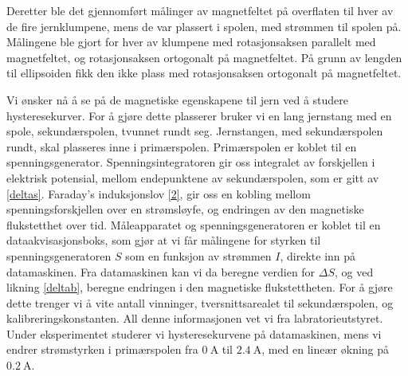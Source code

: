\documentclass[%
 reprint,
 amsmath,amssymb,
 aps,
]{revtex4-1}
\begin{document}
Deretter ble det gjennomført målinger av magnetfeltet på overflaten til hver av de fire jernklumpene, mens de var plassert i spolen, med strømmen til spolen på. Målingene ble gjort for hver av klumpene med rotasjonsaksen parallelt med magnetfeltet, og rotasjonsaksen ortogonalt på magnetfeltet. På grunn av lengden til ellipsoiden fikk den ikke plass med rotasjonsaksen ortogonalt på magnetfeltet.\par
Vi ønsker nå å se på de magnetiske egenskapene til jern ved å studere hysteresekurver. For å gjøre dette plasserer bruker vi en lang jernstang med en spole, sekundærspolen, tvunnet rundt seg. Jernstangen, med sekundærspolen rundt, skal plasseres inne i primærspolen. Primærspolen er koblet til en spenningsgenerator. Spenningsintegratoren gir oss integralet av forskjellen i elektrisk potensial, mellom endepunktene av sekundærspolen, som er gitt av \eqref{deltas}. Faraday's induksjonslov \eqref{2}, gir oss en kobling mellom spenningsforskjellen over en strømsløyfe, og endringen av den magnetiske flukstetthet over tid. Måleapparatet og spenningsgeneratoren er koblet til en dataakvisasjonsboks, som gjør at vi får målingene for styrken til spenningsgeneratoren $S$ som en funksjon av strømmen $I$, direkte inn på datamaskinen. Fra datamaskinen kan vi da beregne verdien for $\Delta S$, og ved likning \eqref{deltab}, beregne endringen i den magnetiske flukstettheten. For å gjøre dette trenger vi å vite antall vinninger, tversnittsarealet til sekundærspolen, og kalibreringskonstanten. All denne informasjonen vet vi fra labratorieutstyret. Under eksperimentet studerer vi hysteresekurvene på datamaskinen, mens vi endrer strømstyrken i primærspolen fra $\SI{0}{\ampere}$ til $\SI{2.4}{\ampere}$, med en lineær økning på $\SI{0.2}{\ampere}$.
\end{document}
